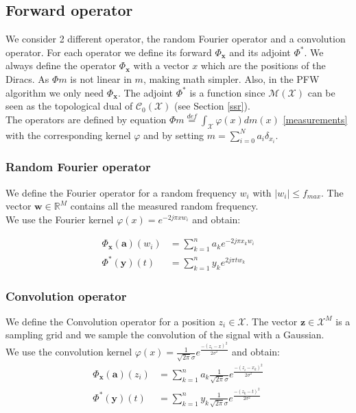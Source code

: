 \documentclass[a4paper,12pt,oneside]{report}
\theoremstyle{named}
\begin{document}
\subsection{Forward operator} \label{operator}
We consider 2 different operator, the random Fourier operator and a convolution operator. For each operator we define its forward $\Phi_\mathbf{x}$ and its adjoint $\Phi^*$. We always define the operator $\Phi_\mathbf{x}$ with a vector $x$ which are the positions of the Diracs. As $\Phi m$ is not linear in $m$, making math simpler. Also, in the PFW algorithm we only need $\Phi_\mathbf{x}$. The adjoint $\Phi^*$ is a function since $\mathcal{M}(\mathcal{X})$ can be seen as the topological dual of $\mathcal{C}_0(\mathcal{X})$ (see Section \ref{ssr}).\\

The operators are defined by equation $\Phi m \stackrel{def}{=} \int_{\mathcal{X}} \varphi(x) dm(x)$ \eqref{measurements} with the corresponding kernel $\varphi$ and by setting $m = \sum_{i = 0}^{N} a_i \delta_{x_i}.$

\subsubsection{Random Fourier operator}
We define the Fourier operator for a random frequency $w_i$ with $|w_i| \leq f_{max}$. The vector $\mathbf{w} \in \mathbb{R}^M$ contains all the measured random frequency. \\

We use the Fourier kernel $\varphi(x) = e^{-2j \pi x w_i}$ and obtain:

\begin{equation}
\begin{split}
    \Phi_\mathbf{x} (\mathbf{a})(w_i) &= \sum_{k = 1}^{n} a_k e^{-2j \pi x_k w_i} \\
    \Phi^*(\mathbf{y})(t) &= \sum_{k = 1}^{n} y_k e^{2j \pi t w_k}
\end{split}
\end{equation}

\subsubsection{Convolution operator}
We define the Convolution operator for a position $z_i \in \mathcal{X}$. The vector $\mathbf{z} \in \mathcal{X}^M$ is a sampling grid and we sample the convolution of the signal with a Gaussian. \\

We use the convolution kernel $\varphi(x) = \frac{1}{\sqrt{2 \pi} \sigma} e^{\frac{-(z_i - x)^2}{2\sigma^2}}$ and obtain:
\begin{equation}
\begin{split}
    \Phi_\mathbf{x} (\mathbf{a})(z_i) &= \sum_{k = 1}^{n} a_k \frac{1}{\sqrt{2 \pi} \sigma} e^{\frac{-(z_i - x_k)^2}{2\sigma^2}} \\
    \Phi^* (\mathbf{y})(t) &= \sum_{k = 1}^{n} y_k \frac{1}{\sqrt{2 \pi} \sigma} e^{\frac{-(z_k - t)^2}{2\sigma^2}}
\end{split}
\end{equation}
\end{document}
